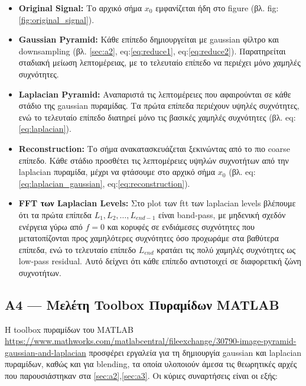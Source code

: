 \documentclass[12pt]{article}
\begin{document}
\begin{itemize}
    \item \textbf{Original Signal:} Το αρχικό σήμα $x_0$ εμφανίζεται ήδη στο figure (βλ. fig:\ref{fig:original_signal}).
    \item \textbf{Gaussian Pyramid:} Κάθε επίπεδο δημιουργείται με gaussian φίλτρο και downsampling (βλ. \ref{sec:a2}, eq:\ref{eq:reduce1}, eq:\ref{eq:reduce2}). Παρατηρείται σταδιακή μείωση λεπτομέρειας, με το τελευταίο επίπεδο να περιέχει μόνο χαμηλές συχνότητες.
    \item \textbf{Laplacian Pyramid:} Αναπαριστά τις λεπτομέρειες που αφαιρούνται σε κάθε στάδιο της gaussian πυραμίδας. Τα πρώτα επίπεδα περιέχουν υψηλές συχνότητες, ενώ το τελευταίο επίπεδο διατηρεί μόνο τις βασικές χαμηλές συχνότητες (βλ. eq:\ref{eq:laplacian}).
    \item \textbf{Reconstruction:} Το σήμα ανακατασκευάζεται ξεκινώντας από το πιο coarse επίπεδο. Κάθε στάδιο προσθέτει τις λεπτομέρειες υψηλών συχνοτήτων από την laplacian πυραμίδα, μέχρι να φτάσουμε στο αρχικό σήμα $x_0$ (βλ. eq:\ref{eq:laplacian_gaussian}, eq:\ref{eq:reconstruction}).
    \item \textbf{FFT των Laplacian Levels:} Στο plot των ftt των laplacian levels βλέπουμε ότι τα πρώτα επίπεδα $L_1,L_2,\dots,L_{end-1}$ είναι band-pass, με μηδενική σχεδόν ενέργεια γύρω από $f = 0$ και κορυφές σε ενδιάμεσες συχνότητες που μετατοπίζονται προς χαμηλότερες συχνότητες όσο προχωράμε στα βαθύτερα επίπεδα, ενώ το τελευταίο επίπεδο $L_{end}$ κρατάει τις πολύ χαμηλές συχνότητες ως low-pass residual. Αυτό δείχνει ότι κάθε επίπεδο αντιστοιχεί σε διαφορετική ζώνη συχνοτήτων.
\end{itemize}











\subsection{A4 — Μελέτη Toolbox Πυραμίδων MATLAB}

Η toolbox πυραμίδων του MATLAB  \url{https://www.mathworks.com/matlabcentral/fileexchange/30790-image-pyramid-gaussian-and-laplacian}
 προσφέρει εργαλεία για τη δημιουργία gaussian και laplacian πυραμίδων, καθώς και για blending, τα οποία υλοποιούν άμεσα τις θεωρητικές αρχές που παρουσιάστηκαν στα \ref{sec:a2},\ref{sec:a3}.
Οι κύριες συναρτήσεις είναι οι εξής:
\end{document}
